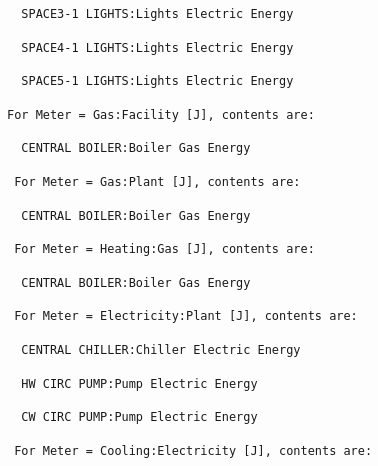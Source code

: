 \begin{lstlisting}
  SPACE3-1 LIGHTS:Lights Electric Energy
\end{lstlisting}

\begin{lstlisting}
  SPACE4-1 LIGHTS:Lights Electric Energy
\end{lstlisting}

\begin{lstlisting}
  SPACE5-1 LIGHTS:Lights Electric Energy
\end{lstlisting}

\begin{lstlisting}
For Meter = Gas:Facility [J], contents are:
\end{lstlisting}

\begin{lstlisting}
  CENTRAL BOILER:Boiler Gas Energy
\end{lstlisting}

\begin{lstlisting}
 For Meter = Gas:Plant [J], contents are:
\end{lstlisting}

\begin{lstlisting}
  CENTRAL BOILER:Boiler Gas Energy
\end{lstlisting}

\begin{lstlisting}
 For Meter = Heating:Gas [J], contents are:
\end{lstlisting}

\begin{lstlisting}
  CENTRAL BOILER:Boiler Gas Energy
\end{lstlisting}

\begin{lstlisting}
 For Meter = Electricity:Plant [J], contents are:
\end{lstlisting}

\begin{lstlisting}
  CENTRAL CHILLER:Chiller Electric Energy
\end{lstlisting}

\begin{lstlisting}
  HW CIRC PUMP:Pump Electric Energy
\end{lstlisting}

\begin{lstlisting}
  CW CIRC PUMP:Pump Electric Energy
\end{lstlisting}

\begin{lstlisting}
 For Meter = Cooling:Electricity [J], contents are:
\end{lstlisting}

